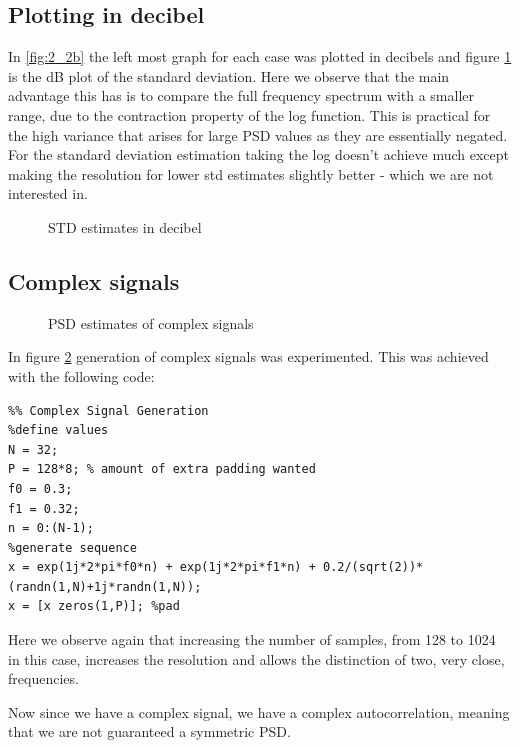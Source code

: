 \documentclass[10pt,twoside,a4paper]{report}
\begin{document}
\subsection{Plotting in decibel}
In \ref{fig:2_2b} the left most graph for each case was plotted in decibels and figure \ref{fig:2_2b4} is the dB plot of the standard deviation. Here we observe that the main advantage this has is to compare the full frequency spectrum with a smaller range, due to the contraction property of the log function. This is practical for the high variance that arises for large PSD values as they are essentially negated. For the standard deviation estimation taking the log doesn't achieve much except making the resolution for lower std estimates slightly better - which we are not interested in.
\begin{figure}[h!]
\centering
\resizebox{\textwidth}{!}{}
\caption{STD estimates in decibel}
\label{fig:2_2b4}
\end{figure}

\subsection{Complex signals}

\begin{figure}[h!]
\centering
\resizebox{\textwidth}{!}{}
\caption{PSD estimates of complex signals}
\label{fig:2_2d}
\end{figure}

In figure \ref{fig:2_2d} generation of complex signals was experimented. This was achieved with the following code:
 
\begin{lstlisting}
%% Complex Signal Generation
%define values
N = 32;
P = 128*8; % amount of extra padding wanted
f0 = 0.3;
f1 = 0.32;
n = 0:(N-1);
%generate sequence  
x = exp(1j*2*pi*f0*n) + exp(1j*2*pi*f1*n) + 0.2/(sqrt(2))*(randn(1,N)+1j*randn(1,N));
x = [x zeros(1,P)]; %pad
\end{lstlisting}
Here we observe again that increasing the number of samples, from 128 to 1024 in this case, increases the resolution and allows the distinction of two, very close, frequencies.

Now since we have a complex signal, we have a complex autocorrelation, meaning that we are not guaranteed a symmetric PSD.
\end{document}

